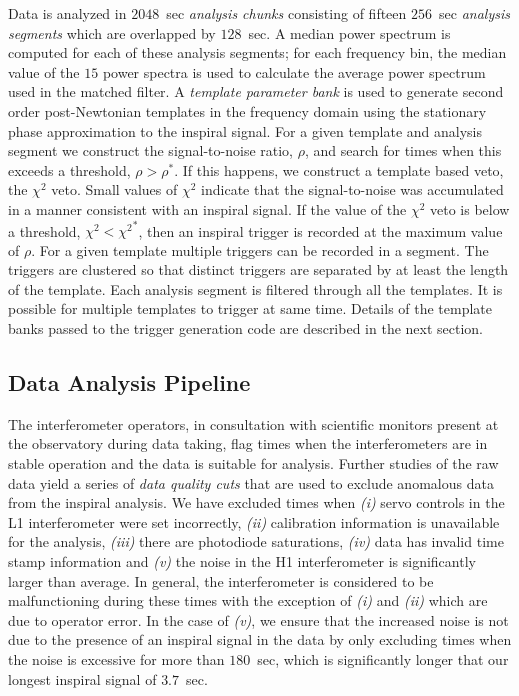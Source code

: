 Data is analyzed in $2048$~sec \emph{analysis chunks} consisting of fifteen
$256$~sec \emph{analysis segments} which are overlapped by $128$~sec. A median
power spectrum is computed for each of these analysis segments; for each
frequency bin, the median value of the $15$ power spectra is used to
calculate the average power spectrum used in the matched filter.  A
\emph{template parameter bank} is used to generate second order post-Newtonian
templates in the frequency domain using the stationary phase approximation to
the inspiral signal. For a given template
and analysis segment we construct the signal-to-noise ratio, $\rho$,  and
search for times when this exceeds a threshold,  $\rho > \rho^\ast$. If this
happens, we construct a template based veto, the $\chi^2$
veto\cite{brucechisq}. Small values of $\chi^2$ indicate that the
signal-to-noise was accumulated in a manner consistent with an inspiral
signal. If the value of the $\chi^2$ veto is below a threshold, $\chi^2 <
{\chi^2}^\ast$, then an inspiral trigger is recorded at the maximum value of
$\rho$. For a given template multiple triggers can be recorded in a segment.
The triggers are clustered so that distinct triggers are separated by at least
the length of the template.  Each analysis segment is filtered through all the
templates. It is possible for multiple templates to trigger at same time.
Details of the template banks passed to the trigger generation code are
described in the next section. 

\subsection{Data Analysis Pipeline}
\label{ss:pipeline}

The interferometer operators, in consultation with scientific monitors present
at the observatory during data taking, flag times when the interferometers are
in stable operation and the data is suitable for analysis.  Further studies of
the raw data yield a series of \emph{data quality cuts} that are used to
exclude anomalous data from the inspiral analysis\cite{gwdawveto}. We have
excluded times when \emph{(i)} servo controls in the L1 interferometer were
set incorrectly, \emph{(ii)} calibration information is unavailable for the
analysis, \emph{(iii)} there are photodiode saturations, \emph{(iv)} data has
invalid time stamp information and \emph{(v)} the noise in the H1
interferometer is significantly larger than average. In general, the
interferometer is considered to be malfunctioning during these times with the
exception of \emph{(i)} and \emph{(ii)} which are due to operator error. In
the case of \emph{(v)}, we ensure that the increased noise is not due to the
presence of an inspiral signal in the data by only excluding times when the
noise is excessive for more than $180$~sec, which is significantly longer that
our longest inspiral signal of $3.7$~sec.

